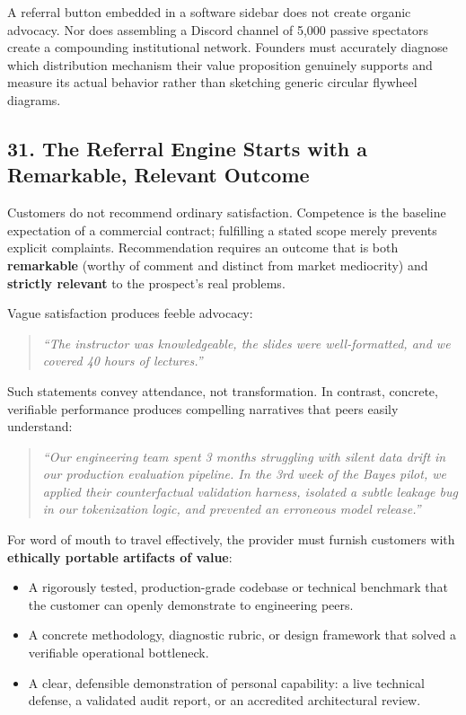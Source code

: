 A referral button embedded in a software sidebar does not create organic advocacy. Nor does assembling a Discord channel of 5,000 passive spectators create a compounding institutional network. Founders must accurately diagnose which distribution mechanism their value proposition genuinely supports and measure its actual behavior rather than sketching generic circular flywheel diagrams.

\subsection*{31. The Referral Engine Starts with a Remarkable, Relevant Outcome}

Customers do not recommend ordinary satisfaction. Competence is the baseline expectation of a commercial contract; fulfilling a stated scope merely prevents explicit complaints. Recommendation requires an outcome that is both \textbf{remarkable} (worthy of comment and distinct from market mediocrity) and \textbf{strictly relevant} to the prospect's real problems.

Vague satisfaction produces feeble advocacy:
\begin{quote}
\textit{``The instructor was knowledgeable, the slides were well-formatted, and we covered 40 hours of lectures.''}
\end{quote}
Such statements convey attendance, not transformation. In contrast, concrete, verifiable performance produces compelling narratives that peers easily understand:
\begin{quote}
\textit{``Our engineering team spent 3 months struggling with silent data drift in our production evaluation pipeline. In the 3rd week of the Bayes pilot, we applied their counterfactual validation harness, isolated a subtle leakage bug in our tokenization logic, and prevented an erroneous model release.''}
\end{quote}
For word of mouth to travel effectively, the provider must furnish customers with \textbf{ethically portable artifacts of value}:
\begin{itemize}[leftmargin=*]
\item A rigorously tested, production-grade codebase or technical benchmark that the customer can openly demonstrate to engineering peers.
\item A concrete methodology, diagnostic rubric, or design framework that solved a verifiable operational bottleneck.
\item A clear, defensible demonstration of personal capability: a live technical defense, a validated audit report, or an accredited architectural review.
\end{itemize}

